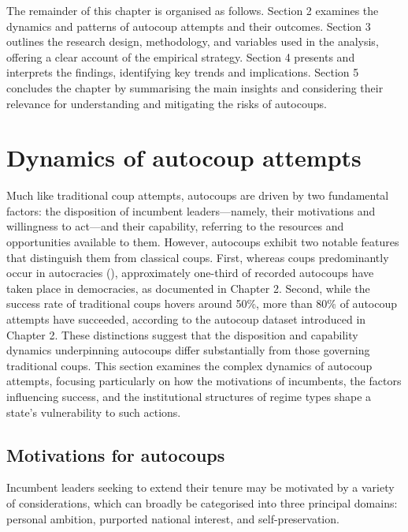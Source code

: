 \documentclass[
  12pt,
]{report}
\begin{document}
The remainder of this chapter is organised as follows. Section 2
examines the dynamics and patterns of autocoup attempts and their
outcomes. Section 3 outlines the research design, methodology, and
variables used in the analysis, offering a clear account of the
empirical strategy. Section 4 presents and interprets the findings,
identifying key trends and implications. Section 5 concludes the chapter
by summarising the main insights and considering their relevance for
understanding and mitigating the risks of autocoups.

\section{Dynamics of autocoup
attempts}\label{dynamics-of-autocoup-attempts}

Much like traditional coup attempts, autocoups are driven by two
fundamental factors: the disposition of incumbent leaders---namely,
their motivations and willingness to act---and their capability,
referring to the resources and opportunities available to them. However,
autocoups exhibit two notable features that distinguish them from
classical coups. First, whereas coups predominantly occur in autocracies
(), approximately
one-third of recorded autocoups have taken place in democracies, as
documented in Chapter 2. Second, while the success rate of traditional
coups hovers around 50\%, more than 80\% of autocoup attempts have
succeeded, according to the autocoup dataset introduced in Chapter 2.
These distinctions suggest that the disposition and capability dynamics
underpinning autocoups differ substantially from those governing
traditional coups. This section examines the complex dynamics of
autocoup attempts, focusing particularly on how the motivations of
incumbents, the factors influencing success, and the institutional
structures of regime types shape a state's vulnerability to such
actions.

\subsection*{Motivations for autocoups}\label{motivations-for-autocoups}

Incumbent leaders seeking to extend their tenure may be motivated by a
variety of considerations, which can broadly be categorised into three
principal domains: personal ambition, purported national interest, and
self-preservation.
\end{document}
